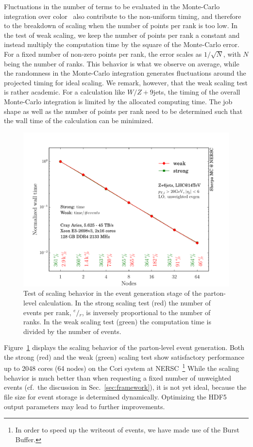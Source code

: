 \documentclass[aps,prd,twocolumn,fleqn,superscriptaddress,groupedaddress,nofootinbib,preprintnumbers]{revtex4}
\begin{document}
Fluctuations in the number of terms to be evaluated in the
Monte-Carlo integration over color~\cite{Maltoni:2002mq,Duhr:2006iq}
also contribute to the non-uniform timing, and therefore to the
breakdown of scaling when the number of points per rank is too low.
In the test of weak scaling, we keep the number of points per rank
a constant and instead multiply the computation time by the square
of the Monte-Carlo error. For a fixed number of non-zero points
per rank, the error scales as $1/\sqrt{N}$, with $N$ being the number of ranks.
This behavior is what we observe on average, while the randomness
in the Monte-Carlo integration generates fluctuations around the
projected timing for ideal scaling. We remark, however, that the
weak scaling test is rather academic. For a calculation like
$W/Z+9$jets, the timing of the overall Monte-Carlo integration
is limited by the allocated computing time. The job shape
as well as the number of points per rank need to be determined
such that the wall time of the calculation can be minimized.

\begin{figure}[t]
    \centering
    \includegraphics[width=\linewidth]{fig/gen_scale.pdf}
    \caption{Test of scaling behavior in the event generation stage
      of the parton-level calculation. In the strong scaling test (red)
      the number of events per rank, $^e\!/\!_r$, is inversely proportional
      to the number of ranks. In the weak scaling test (green)
      the computation time is divided by the number of events.}
    \label{fig:gen_scaling}
\end{figure}
Figure~\ref{fig:gen_scaling} displays the scaling behavior of the parton-level
event generation. Both the strong (red) and the weak (green) scaling test show
satisfactory performance up to 2048 cores (64 nodes) on the Cori system at
NERSC~\cite{cori}\footnote{In order to speed up the writeout of events,
  we have made use of the Burst Buffer.}
While the scaling behavior is much better than when requesting a fixed number
of unweighted events (cf.\ the discussion in Sec.~\ref{sec:framework}),
it is not yet ideal, because the file size for event storage is determined
dynamically. Optimizing the HDF5 output parameters may lead to further
improvements.
\end{document}
